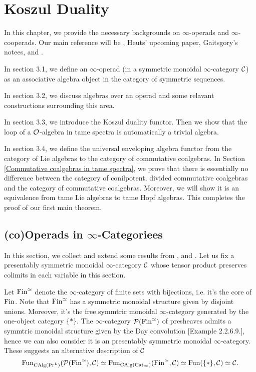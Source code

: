 \chapter{Koszul Duality}

In this chapter, we provide the necessary backgrounds on $\infty$-operads and $\infty$-cooperads.
Our main reference will be \cite{BrantnerPhD},  Heuts' upcoming paper, Gaitsgory's notees, \cite{Hadrianphdthesis} and \cite{HA}.
 
In section 3.1, we define an $\infty$-operad (in a symmetric monoidal $\infty$-category ${\mathcal{C}}$) as an associative algebra object in the category of symmetric sequences.

In section 3.2, we discuss algebras over an operad and some relavant constructions surrounding this area. 

In section 3.3, we introduce the Koszul duality functor. Then we show that the loop of a ${\mathcal{O}}$-algebra in tame spectra is automatically a trivial algebra.

In section 3.4, we define the universal enveloping algebra functor from the category of Lie algebras to the category of commutative coalgebras. 
In Section \ref{Commutative coalgebras in tame spectra}, we prove that there is essentially no difference between the category of conilpotent, divided commutative coalgebras and the category of commutative coalgebras.
Moreover, we will show it is an equivalence from tame Lie algebras to tame Hopf algebras. This completes the proof of our first main theorem.

\section{(co)Operads in $\infty$-Categoriees}
In this section, we collect and extend some results from \cite{Francis-Gaitsgory}, \cite{HA} and \cite{HeutsSurvey}.
Let us fix a presentably symmetric monoidal $\infty$-category ${\mathcal{C}}$ whose tensor product preserves colimits in each variable in this section.

Let $\operatorname{Fin}^{\simeq}$ denote the $\infty$-category of finite sets with bijections, i.e. it's the core of $\operatorname{Fin}$. 
Note that $\operatorname{Fin}^{\simeq}$ has a symmetric monoidal structure given by disjoint unions. Moreover, it's the free symmtric monoidal $\infty$-category generated by the one-object category $\{*\}$.
The $\infty$-category ${\mathcal{P}}(\operatorname{Fin}^{\simeq})$ of presheaves admits a symmtric monoidal structure given by the Day convolution \cite{HA}[Example 2.2.6.9.], hence we can also consider it is an presentably symmetric monoidal $\infty$-category. These suggests an alternative description of ${\mathcal{C}}$
\[
\operatorname{Fun}_{\operatorname{CAlg}(\Pr^L)}({\mathcal{P}}(\operatorname{Fin}^{\simeq}), {\mathcal{C}}) 
\simeq 
\operatorname{Fun}_{\operatorname{CAlg}(\operatorname{Cat}_{\infty})} (\operatorname{Fin}^{\simeq}, {\mathcal{C}})
\simeq
\operatorname{Fun}(\{*\}, {\mathcal{C}})
\simeq 
{\mathcal{C}}.
\]



